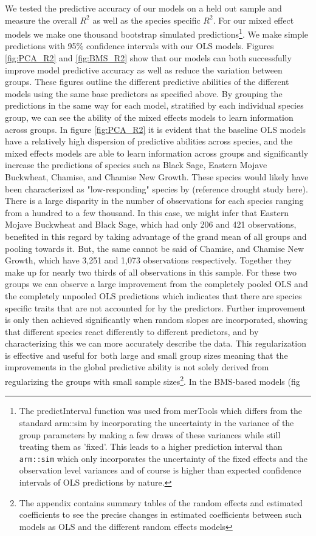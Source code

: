 \documentclass[twocolumn,10pt]{article}
\begin{document}


We tested the predictive accuracy of our models on a held out sample and measure the overall $R^{2}$ as well as the species specific $R^{2}$. For our mixed effect models we make one thousand bootstrap simulated predictions\footnote{The predictInterval function was used from merTools which differs from the standard arm::sim by incorporating the uncertainty in the variance of the group parameters by making a few draws of these variances while still treating them as 'fixed'. This leads to a higher prediction interval than \texttt{arm::sim} which only incorporates the uncertainty of the fixed effects and the observation level variances and of course is higher than expected confidence intervals of OLS predictions by nature. }. We make simple predictions with 95\% confidence intervals with our OLS models. Figures \ref{fig:PCA_R2} and \ref{fig:BMS_R2} show that our models can both successfully improve model predictive accuracy as well as reduce the variation between groups. These figures outline the different predictive abilities of the different models using the same base predictors as specified above. By grouping the predictions in the same way for each model, stratified by each individual species group, we can see the ability of the mixed effects models to learn information across groups. In figure \ref{fig:PCA_R2} it is evident that the baseline OLS models have a relatively high dispersion of predictive abilities across species, and the mixed effects models are able to learn information across groups and significantly increase the predictions of species such as Black Sage, Eastern Mojave Buckwheat, Chamise, and Chamise New Growth. These species would likely have been characterized as "low-responding" species by (reference drought study here).  There is a large disparity in the number of observations for each species ranging from a hundred to a few thousand. In this case, we might infer that Eastern Mojave Buckwheat and Black Sage, which had only 206 and 421 observations, benefited in this regard by taking advantage of the grand mean of all groups and pooling towards it. But, the same cannot be said of Chamise, and Chamise New Growth, which have 3,251 and 1,073 observations respectively. Together they make up for nearly two thirds of all observations in this sample. For these two groups we can observe a large improvement from the completely pooled OLS and the completely unpooled OLS predictions which indicates that there are species specific traits that are not accounted for by the predictors. Further improvement is only then achieved significantly when random slopes are incorporated, showing that different species react differently to different predictors, and by characterizing this we can more accurately describe the data. This regularization is effective and useful for both large and small group sizes meaning that the improvements in the global predictive ability is not solely derived from regularizing the groups with small sample sizes\footnote{The appendix contains summary tables of the random effects and estimated coefficients to see the precise changes in estimated coefficients between such models as OLS and the different random effects models}. In the BMS-based models (fig 
\end{document}
